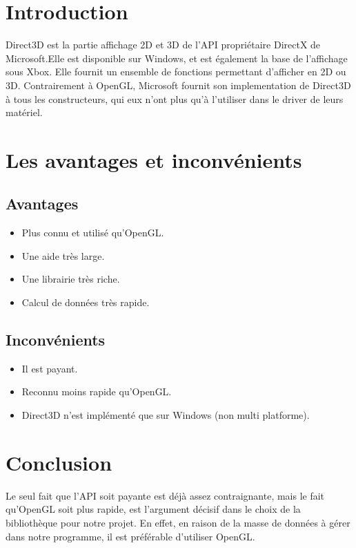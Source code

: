\section{Introduction}
Direct3D est la partie affichage 2D et 3D de l'API propriétaire DirectX de Microsoft.Elle est disponible sur Windows, et est également la base de l'affichage sous Xbox. 
\newline
Elle fournit un ensemble de fonctions permettant d'afficher en 2D ou 3D.
\newline
Contrairement à OpenGL, Microsoft fournit son implementation de Direct3D à tous les constructeurs, qui eux n'ont plus qu'à l'utiliser dans le driver de leurs matériel.
  
\section{Les avantages et inconvénients}
\subsection{Avantages}
\begin{itemize}
\item Plus connu et utilisé qu'OpenGL.
\item Une aide très large.
\item Une librairie très riche.
\item Calcul de données très rapide.
\end{itemize}

\subsection{Inconvénients}
\begin{itemize}
\item Il est payant.
\item Reconnu moins rapide qu'OpenGL.
\item Direct3D n'est implémenté que sur Windows (non multi platforme).
\end{itemize}

\section{Conclusion}
Le seul fait que l'API soit payante est déjà assez contraignante, mais le fait qu'OpenGL soit plus rapide, est l'argument décisif dans le choix de la bibliothèque pour notre projet. En effet, en raison de la masse de données à gérer dans notre programme, il est préférable d'utiliser OpenGL.